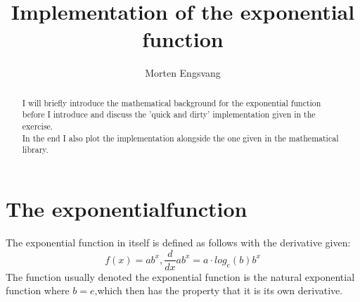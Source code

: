 \documentclass{article}
\title{Implementation of the exponential function}
\author{Morten Engsvang}
\date{}
\begin{document}
\maketitle
\begin{abstract}
I will briefly introduce the mathematical background for the exponential function before I introduce and discuss the 'quick and dirty' implementation given in the exercise.\\
In the end I also plot the implementation alongside the one given in the mathematical library.
\end{abstract}

\section{The exponentialfunction}
The exponential function in itself is defined as follows with the derivative given:
\begin{equation}
	f(x)=ab^x,\frac{d}{dx}ab^x = a\cdot log_e(b)b^x
\end{equation}
The function usually denoted the exponential function is the natural exponential function where $b=e$,which then has the property that it is its own derivative.
\end{document}

